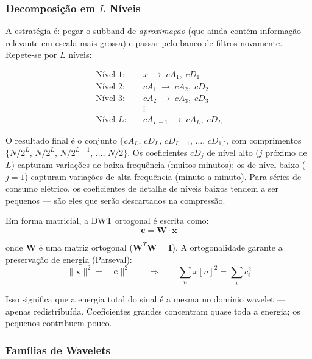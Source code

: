 \documentclass[12pt, a4paper]{article}
\begin{document}
\subsubsection{Decomposição em $L$ Níveis}

A estratégia é: pegar o subband de \emph{aproximação} (que ainda contém informação relevante em escala mais grossa) e passar pelo banco de filtros novamente. Repete-se por $L$ níveis:

\begin{align*}
\text{Nível } 1: &\quad x       \;\to\; cA_1,\; cD_1 \\
\text{Nível } 2: &\quad cA_1    \;\to\; cA_2,\; cD_2 \\
\text{Nível } 3: &\quad cA_2    \;\to\; cA_3,\; cD_3 \\
                 &\quad \vdots \\
\text{Nível } L: &\quad cA_{L-1} \;\to\; cA_L,\; cD_L
\end{align*}

O resultado final é o conjunto $\{cA_L,\, cD_L,\, cD_{L-1},\, \ldots,\, cD_1\}$, com comprimentos $\{N/2^L,\, N/2^L,\, N/2^{L-1},\, \ldots,\, N/2\}$. Os coeficientes $cD_j$ de nível alto ($j$ próximo de $L$) capturam variações de baixa frequência (muitos minutos); os de nível baixo ($j = 1$) capturam variações de alta frequência (minuto a minuto). Para séries de consumo elétrico, os coeficientes de detalhe de níveis baixos tendem a ser pequenos — são eles que serão descartados na compressão.

Em forma matricial, a DWT ortogonal é escrita como:
\begin{equation}
    \mathbf{c} = \mathbf{W} \cdot \mathbf{x}
\end{equation}

onde $\mathbf{W}$ é uma matriz ortogonal ($\mathbf{W}^T \mathbf{W} = \mathbf{I}$). A ortogonalidade garante a preservação de energia (Parseval):
\begin{equation}
    \|\mathbf{x}\|^2 = \|\mathbf{c}\|^2
    \qquad\Longrightarrow\qquad
    \sum_n x[n]^2 = \sum_i c_i^2
\end{equation}

Isso significa que a energia total do sinal é a mesma no domínio wavelet — apenas redistribuída. Coeficientes grandes concentram quase toda a energia; os pequenos contribuem pouco.

\subsubsection{Famílias de Wavelets}
\end{document}
